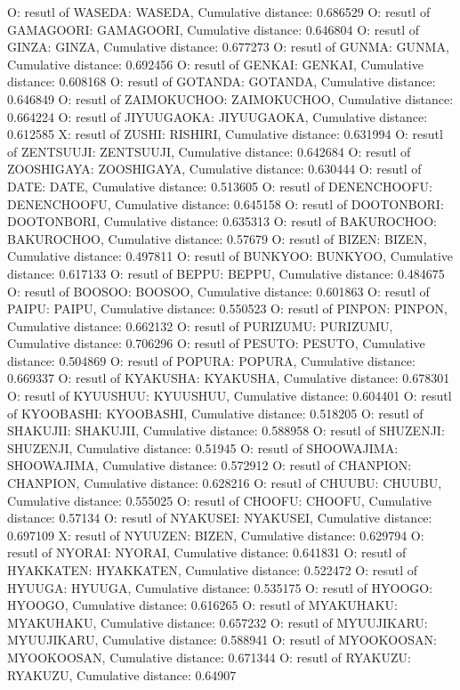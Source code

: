O: resutl of WASEDA: WASEDA, Cumulative distance: 0.686529
O: resutl of GAMAGOORI: GAMAGOORI, Cumulative distance: 0.646804
O: resutl of GINZA: GINZA, Cumulative distance: 0.677273
O: resutl of GUNMA: GUNMA, Cumulative distance: 0.692456
O: resutl of GENKAI: GENKAI, Cumulative distance: 0.608168
O: resutl of GOTANDA: GOTANDA, Cumulative distance: 0.646849
O: resutl of ZAIMOKUCHOO: ZAIMOKUCHOO, Cumulative distance: 0.664224
O: resutl of JIYUUGAOKA: JIYUUGAOKA, Cumulative distance: 0.612585
X: resutl of ZUSHI: RISHIRI, Cumulative distance: 0.631994
O: resutl of ZENTSUUJI: ZENTSUUJI, Cumulative distance: 0.642684
O: resutl of ZOOSHIGAYA: ZOOSHIGAYA, Cumulative distance: 0.630444
O: resutl of DATE: DATE, Cumulative distance: 0.513605
O: resutl of DENENCHOOFU: DENENCHOOFU, Cumulative distance: 0.645158
O: resutl of DOOTONBORI: DOOTONBORI, Cumulative distance: 0.635313
O: resutl of BAKUROCHOO: BAKUROCHOO, Cumulative distance: 0.57679
O: resutl of BIZEN: BIZEN, Cumulative distance: 0.497811
O: resutl of BUNKYOO: BUNKYOO, Cumulative distance: 0.617133
O: resutl of BEPPU: BEPPU, Cumulative distance: 0.484675
O: resutl of BOOSOO: BOOSOO, Cumulative distance: 0.601863
O: resutl of PAIPU: PAIPU, Cumulative distance: 0.550523
O: resutl of PINPON: PINPON, Cumulative distance: 0.662132
O: resutl of PURIZUMU: PURIZUMU, Cumulative distance: 0.706296
O: resutl of PESUTO: PESUTO, Cumulative distance: 0.504869
O: resutl of POPURA: POPURA, Cumulative distance: 0.669337
O: resutl of KYAKUSHA: KYAKUSHA, Cumulative distance: 0.678301
O: resutl of KYUUSHUU: KYUUSHUU, Cumulative distance: 0.604401
O: resutl of KYOOBASHI: KYOOBASHI, Cumulative distance: 0.518205
O: resutl of SHAKUJII: SHAKUJII, Cumulative distance: 0.588958
O: resutl of SHUZENJI: SHUZENJI, Cumulative distance: 0.51945
O: resutl of SHOOWAJIMA: SHOOWAJIMA, Cumulative distance: 0.572912
O: resutl of CHANPION: CHANPION, Cumulative distance: 0.628216
O: resutl of CHUUBU: CHUUBU, Cumulative distance: 0.555025
O: resutl of CHOOFU: CHOOFU, Cumulative distance: 0.57134
O: resutl of NYAKUSEI: NYAKUSEI, Cumulative distance: 0.697109
X: resutl of NYUUZEN: BIZEN, Cumulative distance: 0.629794
O: resutl of NYORAI: NYORAI, Cumulative distance: 0.641831
O: resutl of HYAKKATEN: HYAKKATEN, Cumulative distance: 0.522472
O: resutl of HYUUGA: HYUUGA, Cumulative distance: 0.535175
O: resutl of HYOOGO: HYOOGO, Cumulative distance: 0.616265
O: resutl of MYAKUHAKU: MYAKUHAKU, Cumulative distance: 0.657232
O: resutl of MYUUJIKARU: MYUUJIKARU, Cumulative distance: 0.588941
O: resutl of MYOOKOOSAN: MYOOKOOSAN, Cumulative distance: 0.671344
O: resutl of RYAKUZU: RYAKUZU, Cumulative distance: 0.64907
